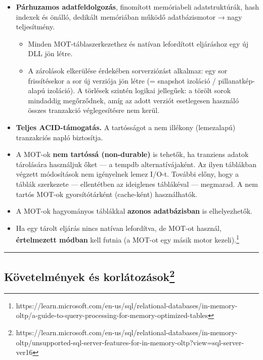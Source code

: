 \documentclass[
  magyar,
]{article}
\providecommand{\tightlist}{%
  \setlength{\itemsep}{0pt}\setlength{\parskip}{0pt}}
\begin{document}
\begin{itemize}
\tightlist
\item
  \textbf{Párhuzamos adatfeldolgozás}, finomított memóriabeli
  adatstruktúrák, hash indexek és önálló, dedikált memóriában működő
  adatbázismotor → nagy teljesítmény.

  \begin{itemize}
  \tightlist
  \item
    Minden MOT-táblaszerkezethez és natívan lefordított eljáráshoz egy
    új DLL jön létre.
  \item
    A zárolások elkerülése érdekében sorverziózást alkalmaz: egy sor
    frissítésekor a sor új verziója jön létre (= snapshot izoláció /
    pillanatkép-alapú izoláció). A törlések szintén logikai jellegűek: a
    törölt sorok mindaddig megőrződnek, amíg az adott verziót
    esetlegesen használó összes tranzakció véglegesítésre nem kerül.
  \end{itemize}
\item
  \textbf{Teljes ACID-támogatás.} A tartósságot a nem illékony
  (lemezalapú) tranzakciós napló biztosítja.
\item
  A MOT-ok \textbf{nem tartóssá (non-durable)} is tehetők, ha tranziens
  adatok tárolására használjuk őket --- a tempdb alternatívájaként. Az
  ilyen táblákban végzett módosítások nem igényelnek lemez I/O-t.
  További előny, hogy a táblák szerkezete --- ellentétben az ideiglenes
  táblákéval --- megmarad. A nem tartós MOT-ok gyorsítótárként
  (cache-ként) használhatók.
\item
  A MOT-ok hagyományos táblákkal \textbf{azonos adatbázisban} is
  elhelyezhetők.
\item
  Ha egy tárolt eljárás nincs natívan lefordítva, de MOT-ot használ,
  \textbf{értelmezett módban} kell futnia (a MOT-ot egy másik motor
  kezeli).\footnote{https://learn.microsoft.com/en-us/sql/relational-databases/in-memory-oltp/a-guide-to-query-processing-for-memory-optimized-tables}
\end{itemize}

\begin{center}\rule{0.5\linewidth}{0.5pt}\end{center}

\subsection[Követelmények és korlátozások]{\texorpdfstring{Követelmények
és
korlátozások\footnote{https://learn.microsoft.com/en-us/sql/relational-databases/in-memory-oltp/unsupported-sql-server-features-for-in-memory-oltp?view=sql-server-ver16}}{Követelmények és korlátozások}}\label{kuxf6vetelmuxe9nyek-uxe9s-korluxe1tozuxe1sok52}
\end{document}
